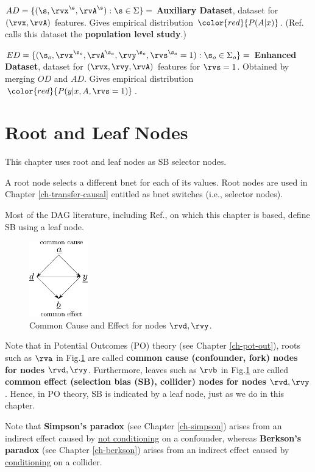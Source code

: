 $AD=\{(\s, \rvx^\s,\rvA^\s):\s\in\Sigma\}=$
{\bf Auxiliary Dataset}, dataset for $(\rvx, \rvA)$ features.
Gives empirical
distribution $\color{red}{P(A|x)}$.
(Ref.\cite{bare-sb-removal}
calls this dataset the
{\bf population level study}.)


$ED=\{({\s_o},\rvx^{\s_o}, \rvA^{\s_o}, \rvy^{\s_o},
\rvs^{\s_o}=1):{\s_o}\in\Sigma_o\}=$
{\bf Enhanced Dataset}, dataset for $(\rvx,\rvy, \rvA)$ features
for $\rvs=1$.
Obtained by merging $OD$ and $AD$.
Gives empirical
distribution $\color{red}{P(y|x, A, \rvs=1)}$.

\section{Root and Leaf Nodes}

This chapter uses root and leaf nodes
as SB selector nodes.

A root node selects a different bnet 
for each of its values.
Root nodes are used
in Chapter \ref{ch-transfer-causal}
entitled 
as bnet switches (i.e., selector nodes).


Most of the DAG literature,
including Ref.\cite{bare-sb-removal},
on which this chapter is based,
define SB using a leaf node.


\begin{figure}[h!]
\centering
\includegraphics[width=1in]
{sb-removal/common-cause-effect.png}
\caption{Common Cause
and Effect for
nodes $\rvd,\rvy$.}
\label{fig-common-cause-effect}
\end{figure}

Note
that in Potential
Outcomes (PO) theory
 (see Chapter \ref{ch-pot-out}),
roots such
as $\rva$ in
Fig.\ref{fig-common-cause-effect}
are called {\bf common cause
 (confounder, fork) nodes
for nodes $\rvd, \rvy$}.
Furthermore, leaves such as
$\rvb$ in
Fig.\ref{fig-common-cause-effect} are
called
{\bf common effect
(selection bias (SB), collider) nodes
for nodes $\rvd, \rvy$}.
Hence, in PO theory,
SB is indicated
by
a leaf node,
just as we do in this chapter.

Note that
{\bf Simpson's paradox} (see Chapter
\ref{ch-simpson}) arises from an indirect effect
caused by \ul{not conditioning}
on a confounder,
whereas
{\bf Berkson's paradox}
(see Chapter \ref{ch-berkson})
arises from an indirect effect
caused by \ul{conditioning}
on a collider.




